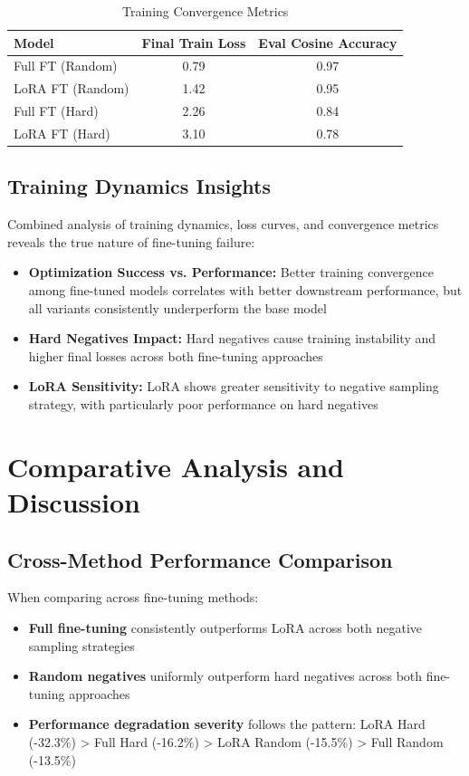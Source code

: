 \begin{table}[h]
\centering
\caption{Training Convergence Metrics}
\label{tab:training_metrics_thesis}
\begin{tabular}{lcc}
\toprule
Model & Final Train Loss & Eval Cosine Accuracy \\
\midrule
Full FT (Random) & 0.79 & 0.97 \\
LoRA FT (Random) & 1.42 & 0.95 \\
Full FT (Hard) & 2.26 & 0.84 \\
LoRA FT (Hard) & 3.10 & 0.78 \\
\bottomrule
\end{tabular}
\end{table}

\subsection{Training Dynamics Insights}

Combined analysis of training dynamics, loss curves, and convergence metrics reveals the true nature of fine-tuning failure:

\begin{itemize}
\item \textbf{Optimization Success vs. Performance:} Better training convergence among fine-tuned models correlates with better downstream performance, but all variants consistently underperform the base model
\item \textbf{Hard Negatives Impact:} Hard negatives cause training instability and higher final losses across both fine-tuning approaches
\item \textbf{LoRA Sensitivity:} LoRA shows greater sensitivity to negative sampling strategy, with particularly poor performance on hard negatives
\end{itemize}

\section{Comparative Analysis and Discussion}

\subsection{Cross-Method Performance Comparison}

When comparing across fine-tuning methods:

\begin{itemize}
\item \textbf{Full fine-tuning} consistently outperforms LoRA across both negative sampling strategies
\item \textbf{Random negatives} uniformly outperform hard negatives across both fine-tuning approaches
\item \textbf{Performance degradation severity} follows the pattern: LoRA Hard (-32.3\%) > Full Hard (-16.2\%) > LoRA Random (-15.5\%) > Full Random (-13.5\%)
\end{itemize}

